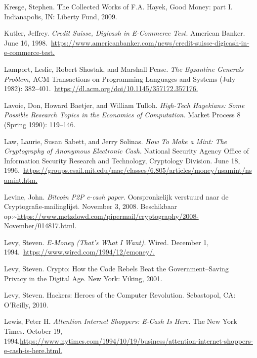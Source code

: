\documentclass[smalldemyvopaper,11pt,twoside,onecolumn,openright,extrafontsizes,hidelinks]{memoir}
\begin{document}
Kresge, Stephen. The Collected Works of F.A. Hayek, Good Money: part I.
Indianapolis, IN: Liberty Fund, 2009.

Kutler, Jeffrey. \emph{Credit Suisse, Digicash in E-Commerce Test.}
American Banker. June 16,
1998.~\href{https://www.americanbanker.com/news/credit-suisse-digicash-in-e-commerce-test}{https://www.americanbanker.com/news/credit-suisse-digicash-in-e-commerce-test.}

Lamport, Leslie, Robert Shostak, and Marshall Pease. \emph{The Byzantine
Generals Problem,} ACM Transactions on Programming Languages and Systems
(July 1982):
382--401.~\href{https://dl.acm.org/doi/10.1145/357172.357176}{https://dl.acm.org/doi/10.1145/357172.357176.}

Lavoie, Don, Howard Baetjer, and William Tulloh. \emph{High-Tech
Hayekians: Some Possible Research Topics in the Economics of
Computation.} Market Process 8 (Spring 1990): 119--146.

Law, Laurie, Susan Sabett, and Jerry Solinas. \emph{How To Make a Mint:
The Cryptography of Anonymous Electronic Cash.} National Security Agency
Office of Information Security Research and Technology, Cryptology
Division. June 18,
1996.~\href{https://groups.csail.mit.edu/mac/classes/6.805/articles/money/nsamint/nsamint.htm}{https://groups.csail.mit.edu/mac/classes/6.805/articles/money/nsamint/nsamint.htm.}

Levine, John. \emph{Bitcoin P2P e-cash paper.} Oorspronkelijk verstuurd
naar de Cryptografie-mailinglijst. November 3, 2008. Beschikbaar
op:\textasciitilde{}\href{https://www.metzdowd.com/pipermail/cryptography/2008-November/014817.html}{https://www.metzdowd.com/pipermail/cryptography/2008-November/014817.html.}

Levy, Steven. \emph{E-Money (That's What I Want).} Wired. December 1,
1994.~\href{https://www.wired.com/1994/12/emoney/}{https://www.wired.com/1994/12/emoney/.}

Levy, Steven. Crypto: How the Code Rebels Beat the Government--Saving
Privacy in the Digital Age. New York: Viking, 2001.

Levy, Steven. Hackers: Heroes of the Computer Revolution. Sebastopol,
CA: O'Reilly, 2010.

Lewis, Peter H. \emph{Attention Internet Shoppers: E-Cash Is Here.} The
New York Times. October 19,
1994.\href{https://www.nytimes.com/1994/10/19/business/attention-internet-shoppers-e-cash-is-here.html}{https://www.nytimes.com/1994/10/19/business/attention-internet-shoppers-e-cash-is-here.html.}
\end{document}
